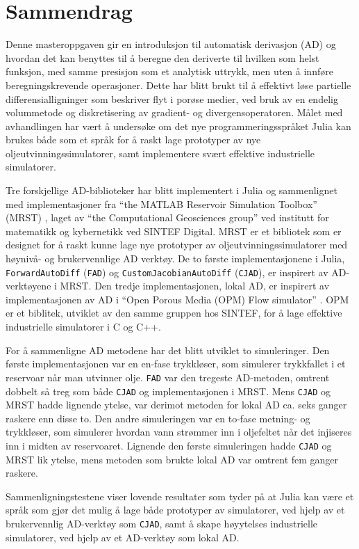 \chapter*{Sammendrag}
Denne masteroppgaven gir en introduksjon til automatisk derivasjon (AD) og hvordan det kan benyttes til å beregne den deriverte til hvilken som helst funksjon, med samme presisjon som et analytisk uttrykk, men uten å innføre beregningskrevende operasjoner. Dette har blitt brukt til å effektivt løse partielle differensialligninger som beskriver flyt i porøse medier, ved bruk av en endelig volummetode og diskretisering av gradient- og divergensoperatoren. Målet med avhandlingen har vært å undersøke om det nye programmeringsspråket Julia kan brukes både som et språk for å raskt lage prototyper av nye oljeutvinningssimulatorer, samt implementere svært effektive industrielle simulatorer.

Tre forskjellige AD-biblioteker har blitt implementert i Julia og sammenlignet med implementasjoner fra \enquote{the MATLAB Reservoir Simulation Toolbox} (MRST) \emph{\citep{mrstHomepage}}, laget av \enquote{the Computational Geosciences group} ved institutt for matematikk og kybernetikk ved SINTEF Digital. MRST er et bibliotek som er designet for å raskt kunne lage nye prototyper av oljeutvinningssimulatorer med høynivå- og brukervennlige AD verktøy. De to første implementasjonene i Julia, \texttt{ForwardAutoDiff} (\texttt{FAD}) og \texttt{CustomJacobianAutoDiff} (\texttt{CJAD}), er inspirert av AD-verktøyene i MRST. Den tredje implementasjonen, lokal AD, er inspirert av implementasjonen av AD i \enquote{Open Porous Media (OPM) Flow simulator} \emph{\citep{opm}}. OPM er et biblitek, utviklet av den samme gruppen hos SINTEF, for å lage effektive industrielle simulatorer i C og C++.

For å sammenligne AD metodene har det blitt utviklet to simuleringer. Den første implementasjonen var en en-fase trykkløser, som simulerer trykkfallet i et reservoar når man utvinner olje. \texttt{FAD} var den tregeste AD-metoden, omtrent dobbelt så treg som både \texttt{CJAD} og implementasjonen i MRST. Mens \texttt{CJAD} og MRST hadde lignende ytelse, var derimot metoden for lokal AD ca. seks ganger raskere enn disse to. Den andre simuleringen var en to-fase metning- og trykkløser, som simulerer hvordan vann strømmer inn i oljefeltet når det injiseres inn i midten av reservoaret. Lignende den første simuleringen hadde \texttt{CJAD} og MRST lik ytelse, mens metoden som brukte lokal AD var omtrent fem ganger raskere.

Sammenligningstestene viser lovende resultater som tyder på at Julia kan være et språk som gjør det mulig å lage både prototyper av simulatorer, ved hjelp av et brukervennlig AD-verktøy som \texttt{CJAD}, samt å skape høyytelses industrielle simulatorer, ved hjelp av et AD-verktøy som lokal AD.